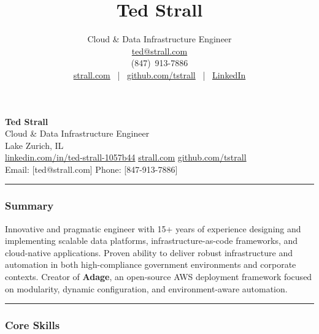 \documentclass[11pt]{article}
\begin{document}
\title{Ted Strall}
\author{Cloud \& Data Infrastructure Engineer \\
\href{mailto:ted@strall.com}{ted@strall.com} \\
(847)~913-7886 \\
\href{https://strall.com}{strall.com} ~|~
\href{https://github.com/tstrall}{github.com/tstrall} ~|~
\href{https://linkedin.com/in/ted-strall-1057b44}{LinkedIn}}
\date{}

\maketitle

\textbf{Ted Strall}\\
Cloud \& Data Infrastructure Engineer\\
Lake Zurich, IL\\
\href{https://www.linkedin.com/in/ted-strall-1057b44}{linkedin.com/in/ted-strall-1057b44}
\textbar{} \href{https://strall.com}{strall.com} \textbar{}
\href{https://github.com/tstrall}{github.com/tstrall}\\
Email: {[}ted@strall.com{]} \textbar{} Phone: {[}847-913-7886{]}

\begin{center}\rule{0.5\linewidth}{0.5pt}\end{center}

\hypertarget{summary}{%
\subsubsection{Summary}\label{summary}}

Innovative and pragmatic engineer with 15+ years of experience designing
and implementing scalable data platforms, infrastructure-as-code
frameworks, and cloud-native applications. Proven ability to deliver
robust infrastructure and automation in both high-compliance government
environments and corporate contexts. Creator of \textbf{Adage}, an
open-source AWS deployment framework focused on modularity, dynamic
configuration, and environment-aware automation.

\begin{center}\rule{0.5\linewidth}{0.5pt}\end{center}

\hypertarget{core-skills}{%
\subsubsection{Core Skills}\label{core-skills}}
\end{document}
